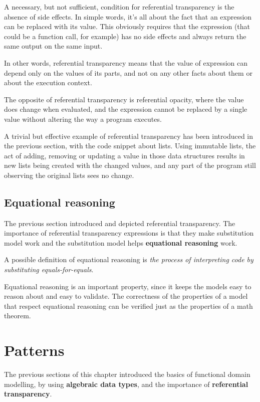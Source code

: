 A necessary, but not sufficient, condition for referential transparency
is the absence of side effects. In simple words, it's all about the fact
that an expression can be replaced with its value. This obviously
requires that the expression (that could be a function call, for
example) has no side effects and always return the same output on the
same input.

In other words, referential transparency means that the value of
expression can depend only on the values of its parts, and not on any
other facts about them or about the execution context.

The opposite of referential transparency is referential opacity, where
the value does change when evaluated, and the expression cannot be
replaced by a single value without altering the way a program executes.

A trivial but effective example of referential transparency has been
introduced in the previous section, with the code snippet about lists.
Using immutable lists, the act of adding, removing or updating a value
in those data structures results in new lists being created with the
changed values, and any part of the program still observing the original
lists sees no change.

\subsection{Equational reasoning}\label{equational-reasoning}

The previous section introduced and depicted referential transparency.
The importance of referential transparency expressions is that they make
substitution model work and the substitution model helps
\textbf{equational reasoning} work.

A possible definition of equational reasoning is \emph{the process of
interpreting code by substituting equals-for-equals}.

Equational reasoning is an important property, since it keeps the models
easy to reason about and easy to validate. The correctness of the
properties of a model that respect equational reasoning can be verified
just as the properties of a math theorem.


\section{Patterns}\label{patterns}

The previous sections of this chapter introduced the basics of
functional domain modelling, by using \textbf{algebraic data types}, and
the importance of \textbf{referential transparency}.

